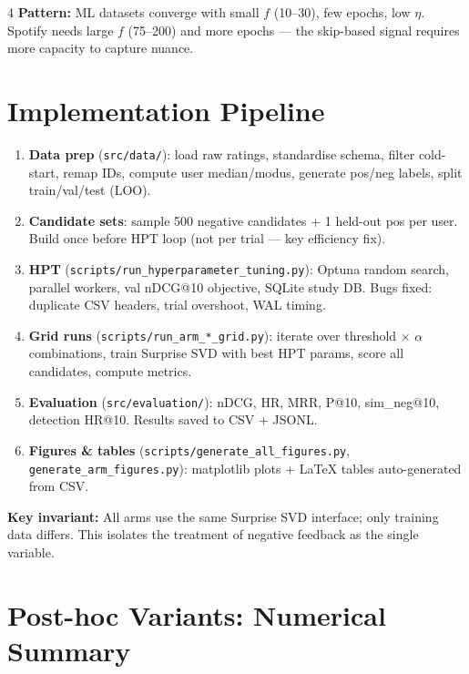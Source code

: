 \documentclass[9pt,a4paper,landscape]{article}
\begin{document}
\begin{multicols}{4}
\vspace{2pt}
\textbf{Pattern:} ML datasets converge with small $f$ (10–30), few epochs, low $\eta$. Spotify needs large $f$ (75–200) and more epochs — the skip-based signal requires more capacity to capture nuance.

\section{Implementation Pipeline}

\colorbox{secbg}{\parbox{\linewidth}{\small
\begin{enumerate}
  \item \textbf{Data prep} (\texttt{src/data/}): load raw ratings, standardise schema, filter cold-start, remap IDs, compute user median/modus, generate pos/neg labels, split train/val/test (LOO).
  \item \textbf{Candidate sets}: sample 500 negative candidates + 1 held-out pos per user. Build once before HPT loop (not per trial — key efficiency fix).
  \item \textbf{HPT} (\texttt{scripts/run\_hyperparameter\_tuning.py}): Optuna random search, parallel workers, val nDCG@10 objective, SQLite study DB. Bugs fixed: duplicate CSV headers, trial overshoot, WAL timing.
  \item \textbf{Grid runs} (\texttt{scripts/run\_arm\_*\_grid.py}): iterate over threshold × $\alpha$ combinations, train Surprise SVD with best HPT params, score all candidates, compute metrics.
  \item \textbf{Evaluation} (\texttt{src/evaluation/}): nDCG, HR, MRR, P@10, sim\_neg@10, detection HR@10. Results saved to CSV + JSONL.
  \item \textbf{Figures \& tables} (\texttt{scripts/generate\_all\_figures.py}, \texttt{generate\_arm\_figures.py}): matplotlib plots + LaTeX tables auto-generated from CSV.
\end{enumerate}
}}

\textbf{Key invariant:} All arms use the same Surprise SVD interface; only training data differs. This isolates the treatment of negative feedback as the single variable.

\section{Post-hoc Variants: Numerical Summary}


\end{multicols}
\end{document}
